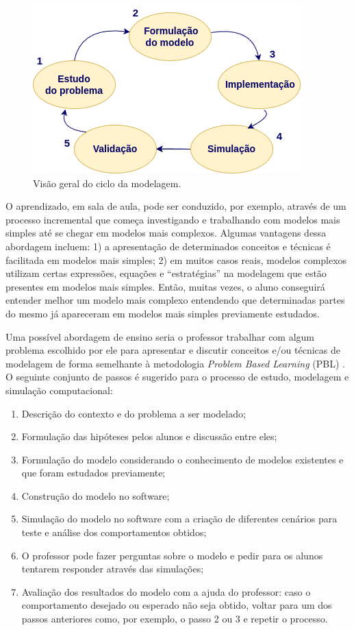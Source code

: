 \documentclass[
	12pt,				%
	openright,			%
	oneside,			%
	a4paper,			%
	main=brazil,
	english,			%
	]{ufsj-abntex2}
\begin{document}
\begin{figure}[h]
    \centering
    \includegraphics[scale=0.5]{imgs/ciclo-modelagem.png} 
    \caption{Visão geral do ciclo da modelagem.}
    \label{fig:ciclo-modelagem}
\end{figure}

O aprendizado, em sala de aula, pode ser conduzido, por exemplo, através de um processo incremental que começa investigando e trabalhando com modelos mais simples até se chegar em modelos mais complexos. Algumas vantagens dessa abordagem incluem:  1) a apresentação de determinados conceitos e técnicas é facilitada em modelos mais simples; 2) em muitos casos reais, modelos complexos utilizam certas expressões, equações e “estratégias” na modelagem que estão presentes em modelos mais simples. Então, muitas vezes, o aluno conseguirá entender melhor um modelo mais complexo entendendo que determinadas partes do mesmo já apareceram em modelos mais simples previamente estudados. 

Uma possível abordagem de ensino seria o professor trabalhar com algum problema escolhido por ele para apresentar e discutir conceitos e/ou técnicas de modelagem de forma semelhante à metodologia \textit{Problem Based Learning} (PBL) \cite{Akcay2009}. O seguinte conjunto de passos é sugerido para o processo de estudo, modelagem e simulação computacional: 

\begin{enumerate}
 \item Descrição do contexto e do problema a ser modelado;
 \item Formulação das hipóteses pelos alunos e discussão entre eles;
 \item Formulação do modelo considerando o conhecimento de modelos existentes e que foram estudados previamente;
 \item Construção do modelo no software;
 \item Simulação do modelo no software com a criação de diferentes cenários para teste e análise dos comportamentos obtidos;
 \item O professor pode fazer perguntas sobre o modelo e pedir para os alunos tentarem responder através das simulações; 
 \item Avaliação dos resultados do modelo com a ajuda do professor: caso o comportamento desejado ou esperado não seja obtido, voltar para um dos passos anteriores como, por exemplo, o passo 2 ou 3 e repetir o processo. 
\end{enumerate}
\end{document}
